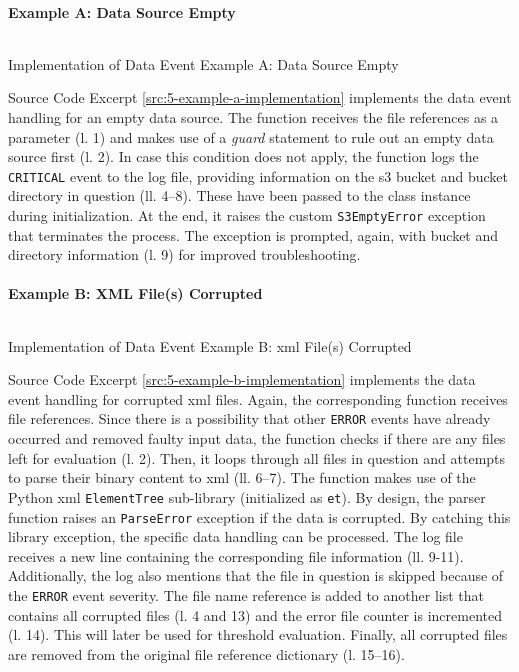 \paragraph{Example A: Data Source Empty}
\begin{listing}[h!]
	\inputminted{python}{main-matter/src/5-a.py}
	\caption{Implementation of Data Event Example A: Data Source Empty}
	\label{src:5-example-a-implementation}
\end{listing}
Source Code Excerpt \ref{src:5-example-a-implementation} implements the data event handling for an empty data source. The function receives the file references as a parameter (l. 1) and makes use of a \textit{guard} statement to rule out an empty data source first (l. 2). In case this condition does not apply, the function logs the \texttt{CRITICAL} event to the log file, providing information on the \ac{s3} bucket and bucket directory in question (ll. 4--8). These have been passed to the class instance during initialization. At the end, it raises the custom \texttt{S3EmptyError} exception that terminates the process. The exception is prompted, again, with bucket and directory information (l. 9) for improved troubleshooting.

\paragraph{Example B: XML File(s) Corrupted}
\begin{listing}[h!]
	\inputminted{python}{main-matter/src/5-b.py}
	\caption{Implementation of Data Event Example B: \acs{xml} File(s) Corrupted}
	\label{src:5-example-b-implementation}
\end{listing}
Source Code Excerpt \ref{src:5-example-b-implementation} implements the data event handling for corrupted \ac{xml} files. Again, the corresponding function receives file references. Since there is a possibility that other \texttt{ERROR} events have already occurred and removed faulty input data, the function checks if there are any files left for evaluation (l. 2). Then, it loops through all files in question and attempts to parse their binary content to \ac{xml} (ll. 6--7). The function makes use of the Python \ac{xml} \texttt{ElementTree} sub-library (initialized as \texttt{et}). By design, the parser function raises an \texttt{ParseError} exception if the data is corrupted. By catching this library exception, the specific data handling can be processed. The log file receives a new line containing the corresponding file information (ll. 9-11). Additionally, the log also mentions that the file in question is skipped because of the \texttt{ERROR} event severity. The file name reference is added to another list that contains all corrupted files (l. 4 and 13) and the error file counter is incremented (l. 14). This will later be used for threshold evaluation. Finally, all corrupted files are removed from the original file reference dictionary (l. 15--16).

